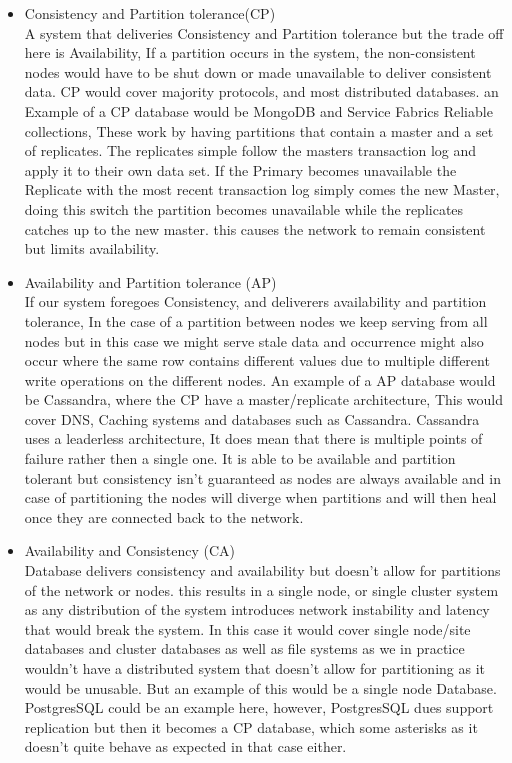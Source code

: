\documentclass[a4paper,10pt,titlepage]{report}
\begin{document}
\begin{itemize}
\item Consistency and Partition tolerance(CP) \\ A system that deliveries Consistency and Partition tolerance but the trade off here is Availability, If a partition occurs in the system, the non-consistent nodes would have to be shut down or made unavailable to deliver consistent data. CP would cover majority protocols, and most distributed databases. an Example of a CP database would be MongoDB and Service Fabrics Reliable collections, These work by having partitions that contain a master and a set of replicates. The replicates simple follow the masters transaction log and apply it to their own data set. If the Primary becomes unavailable the Replicate with the most recent transaction log simply comes the new Master, doing this switch the partition becomes unavailable while the replicates catches up to the new master. this causes the network to remain consistent but limits availability.  \\

\item Availability and Partition tolerance (AP) \\ If our system foregoes Consistency, and deliverers availability and partition tolerance, In the case of a partition between nodes we keep serving from all nodes but in this case we might serve stale data and occurrence might also occur where the same row contains different values due to multiple different write operations on the different nodes. An example of a AP database would be Cassandra, where the CP have a master/replicate architecture, This would cover DNS, Caching systems and databases such as Cassandra. Cassandra uses a leaderless architecture, It does mean that there is multiple points of failure rather then a single one. It is able to be available and partition tolerant but consistency isn't guaranteed as nodes are always available and in case of partitioning the nodes will diverge when partitions and will then heal once they are connected back to the network.   \\

\item Availability and Consistency (CA) \\ Database delivers consistency and availability but doesn't allow for partitions of the network or nodes. this results in a single node, or single cluster system as any distribution of the system introduces network instability and latency that would break the system. In this case it would cover single node/site databases and cluster databases as well as file systems as we in practice wouldn't have a distributed system that doesn't allow for partitioning as it would be unusable. But an example of this would be a single node Database. PostgresSQL could be an example here, however, PostgresSQL dues support replication but then it becomes a CP database, which some asterisks\cite{aphyrpostgres} as it doesn't quite behave as expected in that case either. \\
\end{itemize}
\end{document}
